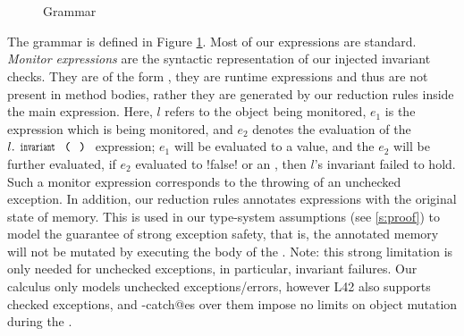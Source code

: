 \begin{figure}
\begin{grammatica}
		
		\\
		\\
		\\
		\\
		\\
		\\
		\\
	\end{grammatica}%
\caption{Grammar}\label{f:grammar}
\end{figure}


The grammar is defined in Figure \ref{f:grammar}. 
Most of our expressions are standard.
\emph{Monitor expressions}
are the syntactic representation of our injected invariant checks.
They are of the form , they 
are runtime expressions and thus are not present in method bodies, rather they are generated by our reduction rules inside the main expression. Here, $l$ refers to the object being monitored, $e_1$ is the expression which is being monitored, and $e_2$ denotes the evaluation of the $l.\invariant$ expression; $e_1$ will be evaluated to a value, and the $e_2$ will be further evaluated, if $e_2$ evaluated to \Q!false! or an \error, then $l$'s invariant failed to hold. Such a monitor expression corresponds to the throwing of an unchecked exception.
In addition, our reduction rules annotates \Q@try@ expressions with
the original state of memory. This is used in our type-system assumptions (see \ref{s:proof}) to model the guarantee of strong exception safety, that is, the annotated memory will not be mutated by executing the body of the \Q@try@.
Note: this strong limitation is only needed for unchecked exceptions, in particular, invariant failures. Our calculus only models unchecked exceptions/errors, however L42 also supports
checked exceptions, and \Q@try-catch@es over them impose no limits on object mutation during the \Q@try@.


